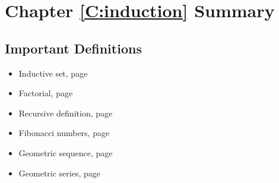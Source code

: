 \newpage
\section{Chapter \ref{C:induction} Summary} \label{Su:induction}

\subsection*{Important Definitions}
\begin{multicols}{2}
\begin{itemize}
\item Inductive set, page~\pageref*{D:inductiveset}
\item Factorial, page~\pageref*{factorial2}
\item Recursive definition, page~\pageref*{recursivedef}
\item Fibonacci numbers, page~\pageref*{fibonacci}
\item Geometric sequence, page~\pageref*{geomseq}
\item Geometric series, page~\pageref*{geometricseries}
\end{itemize}
\end{multicols}
\hbreak



